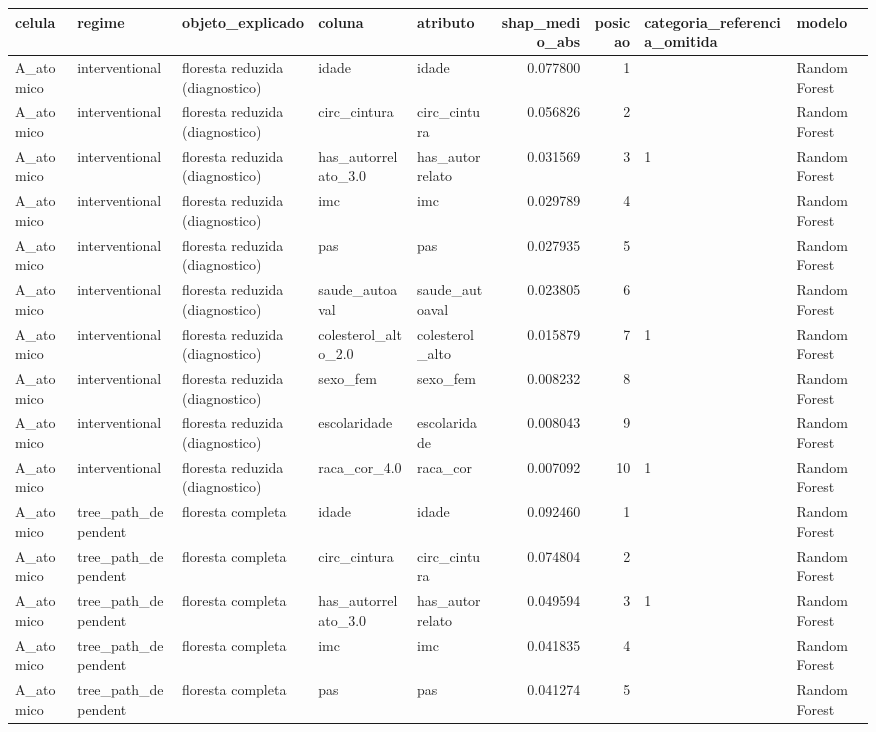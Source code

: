 \begin{tabular}{lllllrrll}
\toprule
celula & regime & objeto_explicado & coluna & atributo & shap_medio_abs & posicao & categoria_referencia_omitida & modelo \\
\midrule
A_atomico & interventional & floresta reduzida (diagnostico) & idade & idade & 0.077800 & 1 &  & Random Forest \\
A_atomico & interventional & floresta reduzida (diagnostico) & circ_cintura & circ_cintura & 0.056826 & 2 &  & Random Forest \\
A_atomico & interventional & floresta reduzida (diagnostico) & has_autorrelato_3.0 & has_autorrelato & 0.031569 & 3 & 1 & Random Forest \\
A_atomico & interventional & floresta reduzida (diagnostico) & imc & imc & 0.029789 & 4 &  & Random Forest \\
A_atomico & interventional & floresta reduzida (diagnostico) & pas & pas & 0.027935 & 5 &  & Random Forest \\
A_atomico & interventional & floresta reduzida (diagnostico) & saude_autoaval & saude_autoaval & 0.023805 & 6 &  & Random Forest \\
A_atomico & interventional & floresta reduzida (diagnostico) & colesterol_alto_2.0 & colesterol_alto & 0.015879 & 7 & 1 & Random Forest \\
A_atomico & interventional & floresta reduzida (diagnostico) & sexo_fem & sexo_fem & 0.008232 & 8 &  & Random Forest \\
A_atomico & interventional & floresta reduzida (diagnostico) & escolaridade & escolaridade & 0.008043 & 9 &  & Random Forest \\
A_atomico & interventional & floresta reduzida (diagnostico) & raca_cor_4.0 & raca_cor & 0.007092 & 10 & 1 & Random Forest \\
A_atomico & tree_path_dependent & floresta completa & idade & idade & 0.092460 & 1 &  & Random Forest \\
A_atomico & tree_path_dependent & floresta completa & circ_cintura & circ_cintura & 0.074804 & 2 &  & Random Forest \\
A_atomico & tree_path_dependent & floresta completa & has_autorrelato_3.0 & has_autorrelato & 0.049594 & 3 & 1 & Random Forest \\
A_atomico & tree_path_dependent & floresta completa & imc & imc & 0.041835 & 4 &  & Random Forest \\
A_atomico & tree_path_dependent & floresta completa & pas & pas & 0.041274 & 5 &  & Random Forest \\

\end{tabular}
